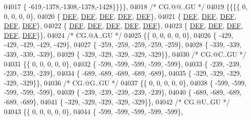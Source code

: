\begin{DoxyCode}
04017 \{ -619,-1378,-1308,-1378,-1428\}\}\}\},
04018 \textcolor{comment}{/* CG.@@..GU */}
04019 \{\{\{\{    0,    0,    0,    0,    0\},
04020 \{  \mbox{\hyperlink{1_88_84__epars_8h_a397419fc12b37ed479c8abb9d444d843}{DEF}},  \mbox{\hyperlink{1_88_84__epars_8h_a397419fc12b37ed479c8abb9d444d843}{DEF}},  \mbox{\hyperlink{1_88_84__epars_8h_a397419fc12b37ed479c8abb9d444d843}{DEF}},  \mbox{\hyperlink{1_88_84__epars_8h_a397419fc12b37ed479c8abb9d444d843}{DEF}},  \mbox{\hyperlink{1_88_84__epars_8h_a397419fc12b37ed479c8abb9d444d843}{DEF}}\},
04021 \{  \mbox{\hyperlink{1_88_84__epars_8h_a397419fc12b37ed479c8abb9d444d843}{DEF}},  \mbox{\hyperlink{1_88_84__epars_8h_a397419fc12b37ed479c8abb9d444d843}{DEF}},  \mbox{\hyperlink{1_88_84__epars_8h_a397419fc12b37ed479c8abb9d444d843}{DEF}},  \mbox{\hyperlink{1_88_84__epars_8h_a397419fc12b37ed479c8abb9d444d843}{DEF}},  \mbox{\hyperlink{1_88_84__epars_8h_a397419fc12b37ed479c8abb9d444d843}{DEF}}\},
04022 \{  \mbox{\hyperlink{1_88_84__epars_8h_a397419fc12b37ed479c8abb9d444d843}{DEF}},  \mbox{\hyperlink{1_88_84__epars_8h_a397419fc12b37ed479c8abb9d444d843}{DEF}},  \mbox{\hyperlink{1_88_84__epars_8h_a397419fc12b37ed479c8abb9d444d843}{DEF}},  \mbox{\hyperlink{1_88_84__epars_8h_a397419fc12b37ed479c8abb9d444d843}{DEF}},  \mbox{\hyperlink{1_88_84__epars_8h_a397419fc12b37ed479c8abb9d444d843}{DEF}}\},
04023 \{  \mbox{\hyperlink{1_88_84__epars_8h_a397419fc12b37ed479c8abb9d444d843}{DEF}},  \mbox{\hyperlink{1_88_84__epars_8h_a397419fc12b37ed479c8abb9d444d843}{DEF}},  \mbox{\hyperlink{1_88_84__epars_8h_a397419fc12b37ed479c8abb9d444d843}{DEF}},  \mbox{\hyperlink{1_88_84__epars_8h_a397419fc12b37ed479c8abb9d444d843}{DEF}},  \mbox{\hyperlink{1_88_84__epars_8h_a397419fc12b37ed479c8abb9d444d843}{DEF}}\}\},
04024 \textcolor{comment}{/* CG.@A..GU */}
04025 \{\{    0,    0,    0,    0,    0\},
04026 \{ -429, -429, -429, -429, -429\},
04027 \{ -259, -259, -259, -259, -259\},
04028 \{ -339, -339, -339, -339, -339\},
04029 \{ -329, -329, -329, -329, -329\}\},
04030 \textcolor{comment}{/* CG.@C..GU */}
04031 \{\{    0,    0,    0,    0,    0\},
04032 \{ -599, -599, -599, -599, -599\},
04033 \{ -239, -239, -239, -239, -239\},
04034 \{ -689, -689, -689, -689, -689\},
04035 \{ -329, -329, -329, -329, -329\}\},
04036 \textcolor{comment}{/* CG.@G..GU */}
04037 \{\{    0,    0,    0,    0,    0\},
04038 \{ -599, -599, -599, -599, -599\},
04039 \{ -239, -239, -239, -239, -239\},
04040 \{ -689, -689, -689, -689, -689\},
04041 \{ -329, -329, -329, -329, -329\}\},
04042 \textcolor{comment}{/* CG.@U..GU */}
04043 \{\{    0,    0,    0,    0,    0\},
04044 \{ -599, -599, -599, -599, -599\},

\end{DoxyCode}
